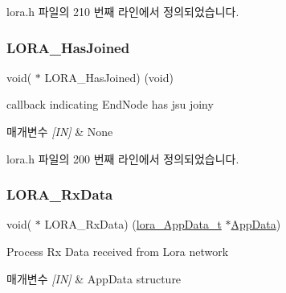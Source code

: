 lora.\+h 파일의 210 번째 라인에서 정의되었습니다.

\mbox{\label{structs_lo_ra_main_callback_a956862bc1dcb958fc8b232f61535c5aa}} 
\subsubsection{\texorpdfstring{L\+O\+R\+A\+\_\+\+Has\+Joined}{LORA\_HasJoined}}
{\footnotesize\ttfamily void( $\ast$ L\+O\+R\+A\+\_\+\+Has\+Joined) (void)}



callback indicating End\+Node has jsu joiny 


\begin{DoxyParams}{매개변수}
{\em \mbox{[}\+I\+N\mbox{]}} & None \\
\hline
\end{DoxyParams}


lora.\+h 파일의 200 번째 라인에서 정의되었습니다.

\mbox{\label{structs_lo_ra_main_callback_a22b1f2ac1a4f3880461e48becfc4530c}} 
\subsubsection{\texorpdfstring{L\+O\+R\+A\+\_\+\+Rx\+Data}{LORA\_RxData}}
{\footnotesize\ttfamily void( $\ast$ L\+O\+R\+A\+\_\+\+Rx\+Data) (\mbox{\hyperlink{structlora___app_data__t}{lora\+\_\+\+App\+Data\+\_\+t}} $\ast$\mbox{\hyperlink{main_8c_a666c0952dd06ca69c3d85952b8c1c8d5}{App\+Data}})}



Process Rx Data received from Lora network 


\begin{DoxyParams}{매개변수}
{\em \mbox{[}\+I\+N\mbox{]}} & App\+Data structure \\
\hline
\end{DoxyParams}


